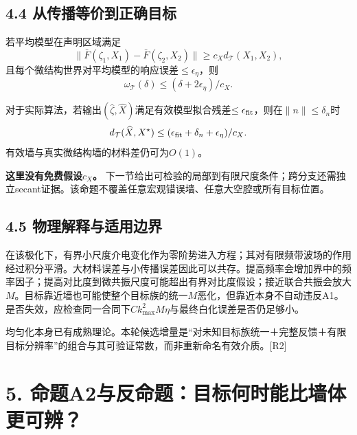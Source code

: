 \documentclass[
  10pt,
  a4paper,
]{article}
\begin{document}
\hypertarget{ux4eceux4f20ux64adux7b49ux4ef7ux5230ux6b63ux786eux76eeux6807}{%
\subsection{4.4
从传播等价到正确目标}\label{ux4eceux4f20ux64adux7b49ux4ef7ux5230ux6b63ux786eux76eeux6807}}

若平均模型在声明区域满足 \[
\|\bar F(\zeta_1,X_1)-\bar F(\zeta_2,X_2)\|
\ge c_X d_{\mathcal T}(X_1,X_2),
\] 且每个微结构世界对平均模型的响应误差\(\le\epsilon_\eta\)，则 \[
\boxed{
\omega_{\mathcal T}(\delta)
\le(\delta+2\epsilon_\eta)/c_X.
}
\]

对于实际算法，若输出\((\widehat\zeta,\widehat X)\)满足有效模型拟合残差\(\le\epsilon_{\rm fit}\)，则在\(\|n\|\le\delta_n\)时
\[
d_{\mathcal T}(\widehat X,X^\star)
\le(\epsilon_{\rm fit}+\delta_n+\epsilon_\eta)/c_X.
\] 有效墙与真实微结构墙的材料差仍可为\(O(1)\)。

\textbf{这里没有免费假设\(c_X\)。}
下一节给出可检验的局部到有限尺度条件；跨分支还需独立secant证据。该命题不覆盖任意宏观错误墙、任意大空腔或所有目标位置。

\hypertarget{ux7269ux7406ux89e3ux91caux4e0eux9002ux7528ux8fb9ux754c}{%
\subsection{4.5
物理解释与适用边界}\label{ux7269ux7406ux89e3ux91caux4e0eux9002ux7528ux8fb9ux754c}}

在该极化下，有界小尺度介电变化作为零阶势进入方程；其对有限频带波场的作用经过积分平滑。大材料误差与小传播误差因此可以共存。提高频率会增加界中的频率因子；提高对比度到微共振尺度可能超出有界对比度假设；接近联合共振会放大\(M\)。目标靠近墙也可能使整个目标族的统一\(M\)恶化，但靠近本身不自动违反A1。是否失效，应检查同一合同下\(Ck_{\max}^2M\eta\)与最终白化误差是否仍足够小。

均匀化本身已有成熟理论。本轮候选增量是``对未知目标族统一＋完整反馈＋有限目标分辨率''的组合与其可验证常数，而非重新命名有效介质。{[}R2{]}

\hypertarget{ux547dux9898a2ux4e0eux53cdux547dux9898ux76eeux6807ux4f55ux65f6ux80fdux6bd4ux5899ux4f53ux66f4ux53efux8fa8}{%
\section{5.
命题A2与反命题：目标何时能比墙体更可辨？}\label{ux547dux9898a2ux4e0eux53cdux547dux9898ux76eeux6807ux4f55ux65f6ux80fdux6bd4ux5899ux4f53ux66f4ux53efux8fa8}}
\end{document}
